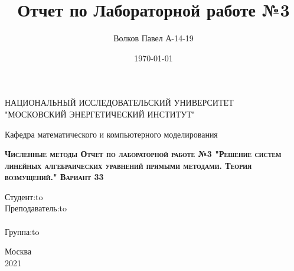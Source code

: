 \documentclass[a4paper,12pt]{report} %
\author{Волков Павел А-14-19}
\title{Отчет по Лабораторной работе №3}
\date{\today}
\begin{document}
\begin{titlepage}
	\newpage

	\begin{center}
	НАЦИОНАЛЬНЫЙ ИССЛЕДОВАТЕЛЬСКИЙ УНИВЕРСИТЕТ\\
		"МОСКОВСКИЙ ЭНЕРГЕТИЧЕСКИЙ ИНСТИТУТ"\\
	\end{center}

	\vspace{8em}	

	\begin{center}
		\Large Кафедра математического и компьютерного моделирования\\ 
	\end{center}

	\vspace{2em}

	\begin{center}
		\textsc{\textbf{ \Large Численные методы \linebreak Отчет по лабораторной работе №3 \linebreak "Решение систем линейных алгебраических уравнений прямыми методами. Теория возмущений." \linebreak Вариант 33}}
	\end{center}

	\vspace{6em}



	\newbox{\lbox}
	\newlength{\maxl}
	\setlength{\maxl}{\wd\lbox}
	\hfill\parbox{11cm}{
		\hspace*{5cm}\hspace*{-5cm}Студент:\hfill\hbox to\\
		\hspace*{5cm}\hspace*{-5cm}Преподаватель:\hfill\hbox to\\
		\\
		\hspace*{5cm}\hspace*{-5cm}Группа:\hfill\hbox to\\
	}


	\vspace{\fill}

	\begin{center}
		Москва \\2021
	\end{center}

\end{titlepage}
\end{document}
